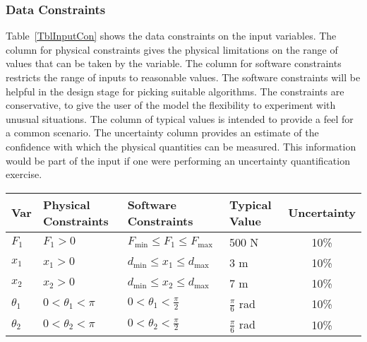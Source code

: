 \documentclass[12pt]{article}
\begin{document}
\subsubsection{Data Constraints} \label{sec_DataConstraints}    

Table~\ref{TblInputCon} shows the data constraints on the input variables.  The 
column for physical constraints gives the physical limitations on the range of 
values that can be taken by the variable. The column for software constraints 
restricts the range of inputs to reasonable values. The software constraints 
will be helpful in the design stage for picking suitable algorithms. The 
constraints are conservative, to give the user of the model the flexibility to 
experiment with unusual situations. The column of typical values is intended to 
provide a feel for a common scenario. The uncertainty column provides an 
estimate of the confidence with which the physical quantities can be measured. 
This information would be part of the input if one were performing an 
uncertainty quantification exercise.

\begin{table}[!h]
  \caption{Input Data Constraints} \label{TblInputCon}
  \renewcommand{\arraystretch}{1.2}
\noindent 
\begin{longtable*}{l l l l c} 
  \toprule
  \textbf{Var} & \textbf{Physical Constraints} & \textbf{Software Constraints} &
                             \textbf{Typical Value} & \textbf{Uncertainty}\\
  \midrule 
  $F_{\text{1}}$ & $F_{\text{1}} > 0$ & $F_{\text{min}} \leq F_{\text{1}} \leq 
  F_{\text{max}}$ & 500 \si{\newton} & 10\%  \\
  $x_{\text{1}}$ & $x_{\text{1}} > 0$ & $d_{\text{min}} \leq x_{\text{1}} \leq 
  d_{\text{max}}$ & 3 \si{\metre} & 10\%  \\
  $x_{\text{2}}$ & $x_{\text{2}} > 0$ & $d_{\text{min}} \leq x_{\text{2}} \leq 
  d_{\text{max}}$ & 7 \si{\metre} & 10\%  \\
  $\theta_{\text{1}}$ & $0 < \theta_{\text{1}} < \pi $ & $0 < \theta_{\text{1}} 
  < \frac{\pi}{2}$ & $\frac{\pi}{6}$ \si{\radian} & 10\%  \\
  $\theta_{\text{2}}$ & $0 < \theta_{\text{2}} < \pi $ & $0 < \theta_{\text{2}} 
  < \frac{\pi}{2}$ & $\frac{\pi}{6}$ \si{\radian} & 10\%  \\
  \bottomrule
 
\end{longtable*}
\end{table}
\end{document}
